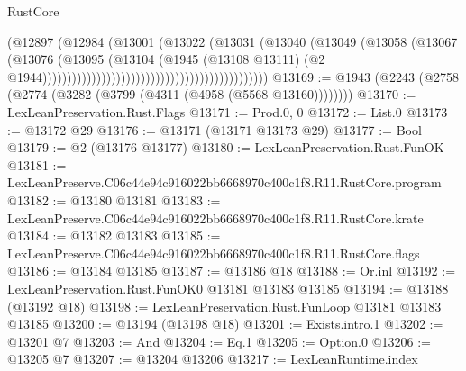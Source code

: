 \begin{lexlean}{RustCore}
\begin{coremodule}
                                                                    (@12897
                                                                      (@12984
                                                                        (@13001
                                                                          (@13022
                                                                            (@13031
                                                                              (@13040
                                                                                (@13049
                                                                                  (@13058
                                                                                    (@13067
                                                                                      (@13076
                                                                                        (@13095
                                                                                          (@13104
                                                                                            (@1945
                                                                                              (@13108
                                                                                                @13111)
                                                                                              (@2
                                                                                                @1944))))))))))))))))))))))))))))))))))))))))))))))
@13169 := @1943 (@2243 (@2758 (@2774 (@3282 (@3799 (@4311 (@4958 (@5568 @13160))))))))
@13170 := LexLeanPreservation.Rust.Flags
@13171 := Prod.{0, 0}
@13172 := List.{0}
@13173 := @13172 @29
@13176 := @13171 (@13171 @13173 @29)
@13177 := Bool
@13179 := @2 (@13176 @13177)
@13180 := LexLeanPreservation.Rust.FunOK
@13181 := LexLeanPreserve.C06c44e94c916022bb6668970c400c1f8.R11.RustCore.program
@13182 := @13180 @13181
@13183 := LexLeanPreserve.C06c44e94c916022bb6668970c400c1f8.R11.RustCore.krate
@13184 := @13182 @13183
@13185 := LexLeanPreserve.C06c44e94c916022bb6668970c400c1f8.R11.RustCore.flags
@13186 := @13184 @13185
@13187 := @13186 @18
@13188 := Or.inl
@13192 := LexLeanPreservation.Rust.FunOK0 @13181 @13183 @13185
@13194 := @13188 (@13192 @18)
@13198 := LexLeanPreservation.Rust.FunLoop @13181 @13183 @13185
@13200 := @13194 (@13198 @18)
@13201 := Exists.intro.{1}
@13202 := @13201 @7
@13203 := And
@13204 := Eq.{1}
@13205 := Option.{0}
@13206 := @13205 @7
@13207 := @13204 @13206
@13217 := LexLeanRuntime.index

\end{coremodule}
\end{lexlean}
